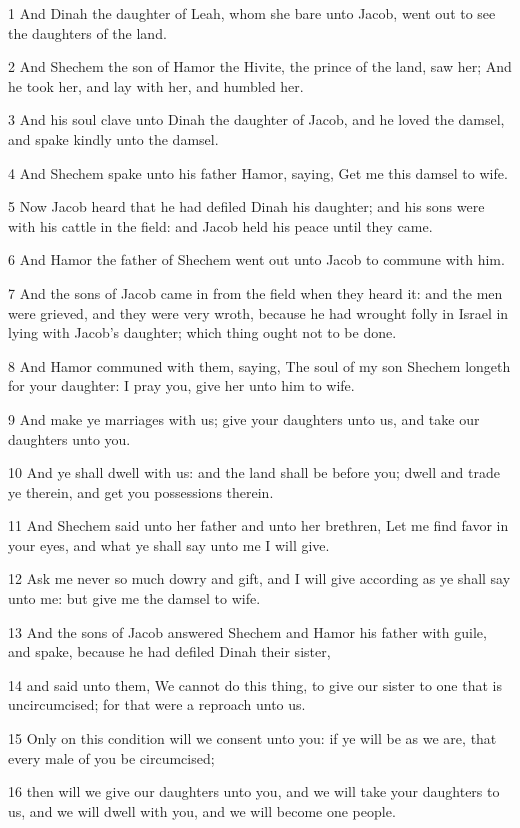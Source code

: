 \par 1 And Dinah the daughter of Leah, whom she bare unto Jacob, went out to see the daughters of the land.
\par 2 And Shechem the son of Hamor the Hivite, the prince of the land, saw her; And he took her, and lay with her, and humbled her.
\par 3 And his soul clave unto Dinah the daughter of Jacob, and he loved the damsel, and spake kindly unto the damsel.
\par 4 And Shechem spake unto his father Hamor, saying, Get me this damsel to wife.
\par 5 Now Jacob heard that he had defiled Dinah his daughter; and his sons were with his cattle in the field: and Jacob held his peace until they came.
\par 6 And Hamor the father of Shechem went out unto Jacob to commune with him.
\par 7 And the sons of Jacob came in from the field when they heard it: and the men were grieved, and they were very wroth, because he had wrought folly in Israel in lying with Jacob's daughter; which thing ought not to be done.
\par 8 And Hamor communed with them, saying, The soul of my son Shechem longeth for your daughter: I pray you, give her unto him to wife.
\par 9 And make ye marriages with us; give your daughters unto us, and take our daughters unto you.
\par 10 And ye shall dwell with us: and the land shall be before you; dwell and trade ye therein, and get you possessions therein.
\par 11 And Shechem said unto her father and unto her brethren, Let me find favor in your eyes, and what ye shall say unto me I will give.
\par 12 Ask me never so much dowry and gift, and I will give according as ye shall say unto me: but give me the damsel to wife.
\par 13 And the sons of Jacob answered Shechem and Hamor his father with guile, and spake, because he had defiled Dinah their sister,
\par 14 and said unto them, We cannot do this thing, to give our sister to one that is uncircumcised; for that were a reproach unto us.
\par 15 Only on this condition will we consent unto you: if ye will be as we are, that every male of you be circumcised;
\par 16 then will we give our daughters unto you, and we will take your daughters to us, and we will dwell with you, and we will become one people.
